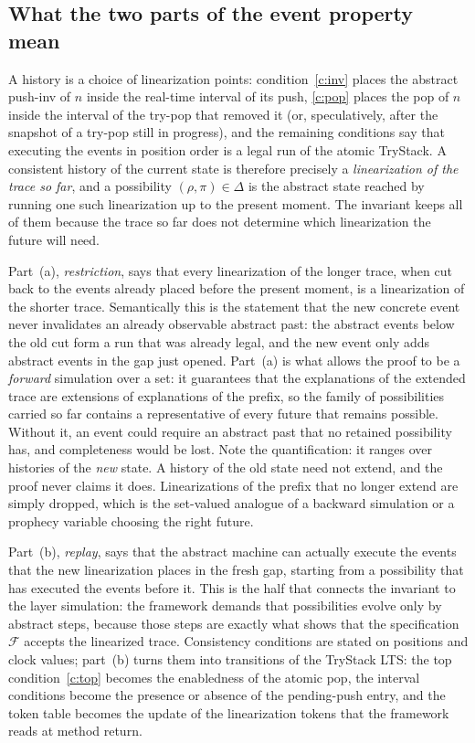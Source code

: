 \documentclass[11pt]{article}
\theoremstyle{definition}
\theoremstyle{remark}
\newcommand{\poss}{\Delta}
\newcommand{\abst}{\rho}
\newcommand{\tokens}{\pi}
\begin{document}
\subsection{What the two parts of the event property mean}

A history is a choice of linearization points: condition~\ref{c:inv} places
the abstract push-inv of \(n\) inside the real-time interval of its push,
\ref{c:pop} places the pop of \(n\) inside the interval of the try-pop that
removed it (or, speculatively, after the snapshot of a try-pop still in
progress), and the remaining conditions say that executing the events in
position order is a legal run of the atomic TryStack.  A consistent history
of the current state is therefore precisely a \emph{linearization of the
trace so far}, and a possibility \((\abst,\tokens)\in\poss\) is the abstract
state reached by running one such linearization up to the present moment.
The invariant keeps all of them because the trace so far does not determine
which linearization the future will need.

Part~(a), \emph{restriction}, says that every linearization of the longer
trace, when cut back to the events already placed before the present
moment, is a linearization of the shorter trace.  Semantically this is the
statement that the new concrete event never invalidates an already
observable abstract past: the abstract events below the old cut form a run
that was already legal, and the new event only adds abstract events in the
gap just opened.  Part~(a) is what allows the proof to be a
\emph{forward} simulation over a set: it guarantees that the explanations
of the extended trace are extensions of explanations of the prefix, so the
family of possibilities carried so far contains a representative of every
future that remains possible.  Without it, an event could require an
abstract past that no retained possibility has, and completeness would be
lost.  Note the quantification: it ranges over histories of the \emph{new}
state.  A history of the old state need not extend, and the proof never
claims it does.  Linearizations of the prefix that no longer extend are
simply dropped, which is the set-valued analogue of a backward simulation
or a prophecy variable choosing the right future.

Part~(b), \emph{replay}, says that the abstract machine can actually
execute the events that the new linearization places in the fresh gap,
starting from a possibility that has executed the events before it.  This
is the half that connects the invariant to the layer simulation: the
framework demands that possibilities evolve only by abstract steps, because
those steps are exactly what shows that the specification \(\mathcal F\)
accepts the linearized trace.  Consistency conditions are stated on
positions and clock values; part~(b) turns them into transitions of the
TryStack LTS: the top condition~\ref{c:top} becomes the enabledness of the
atomic pop, the interval conditions become the presence or absence of the
pending-push entry, and the token table becomes the update of the
linearization tokens that the framework reads at method return.
\end{document}
